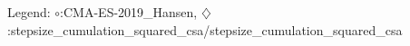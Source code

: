Legend: {\color{CornflowerBlue}$\circ$}:CMA-ES-2019\_Hansen, {\color{Orange}$\diamondsuit$}:stepsize\_cumulation\_squared\_csa/stepsize\_cumulation\_squared\_csa